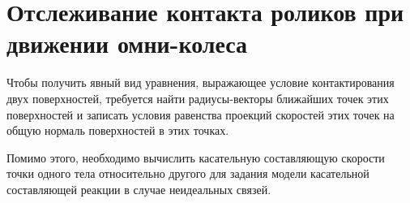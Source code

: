 \section{Отслеживание контакта роликов при движении омни-колеса}\label{sect:track_omni}


Чтобы получить явный вид уравнения, выражающее условие контактирования двух поверхностей, требуется найти радиусы-векторы ближайших точек этих поверхностей и записать условия равенства проекций скоростей этих точек на общую нормаль поверхностей в этих точках.

Помимо этого, необходимо вычислить касательную составляющую скорости точки одного тела относительно другого для задания модели касательной составляющей реакции в случае неидеальных связей.






